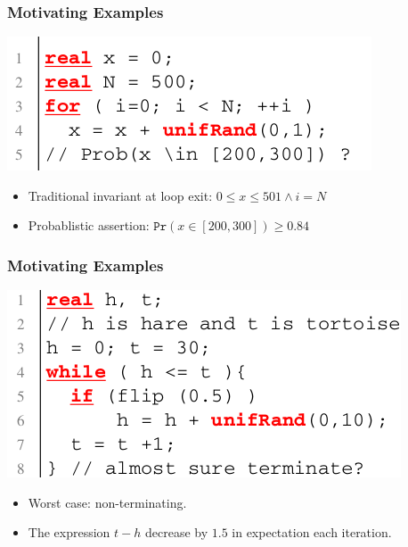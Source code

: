 \documentclass[11pt]{beamer}
\begin{document}
\begin{frame}\frametitle{Motivating Examples}
\begin{example}

\begin{center}
\includegraphics[scale=0.4]{1.png}
\end{center}

\begin{itemize}
\item Traditional invariant at loop exit: $0\le x \le 501 \wedge i = N$

\item Probablistic assertion: $ \texttt{Pr}(x\in [200, 300]) \ge  0.84$
\end{itemize}

\end{example}
\end{frame}

\begin{frame}\frametitle{Motivating Examples}
\begin{example}
\begin{center}
\includegraphics[scale=0.4]{2.png}
\end{center}
\begin{itemize}
\item Worst case: non-terminating.
\item The expression $t - h$ decrease by $1.5$ in expectation each iteration.
\end{itemize}
\end{example}


\end{frame}
\end{document}
